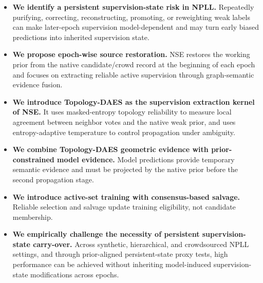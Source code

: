 \begin{itemize}
    \item \textbf{We identify a persistent supervision-state risk in NPLL.} Repeatedly purifying, correcting, reconstructing, promoting, or reweighting weak labels can make later-epoch supervision model-dependent and may turn early biased predictions into inherited supervision state.

    \item \textbf{We propose epoch-wise source restoration.} NSE restores the working prior from the native candidate/crowd record at the beginning of each epoch and focuses on extracting reliable active supervision through graph-semantic evidence fusion.

    \item \textbf{We introduce Topology-DAES as the supervision extraction kernel of NSE.} It uses masked-entropy topology reliability to measure local agreement between neighbor votes and the native weak prior, and uses entropy-adaptive temperature to control propagation under ambiguity.

    \item \textbf{We combine Topology-DAES geometric evidence with prior-constrained model evidence.} Model predictions provide temporary semantic evidence and must be projected by the native prior before the second propagation stage.

    \item \textbf{We introduce active-set training with consensus-based salvage.} Reliable selection and salvage update training eligibility, not candidate membership.

    \item \textbf{We empirically challenge the necessity of persistent supervision-state carry-over.} Across synthetic, hierarchical, and crowdsourced NPLL settings, and through prior-aligned persistent-state proxy tests, high performance can be achieved without inheriting model-induced supervision-state modifications across epochs.
\end{itemize}

